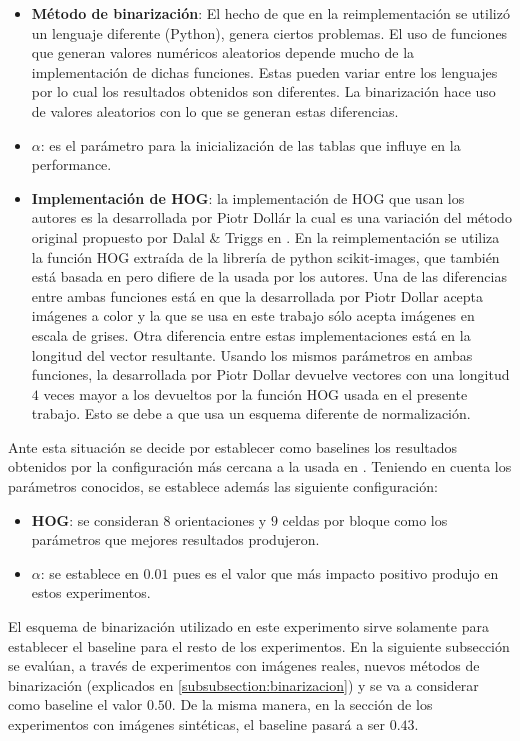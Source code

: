 	\begin{itemize}
		\item \textbf{Método de binarización}: El hecho de que en la reimplementación se utilizó un lenguaje diferente (Python), genera ciertos problemas. El uso de funciones que generan valores numéricos aleatorios depende mucho de la implementación de dichas funciones. Estas pueden variar entre los lenguajes por lo cual los resultados obtenidos son diferentes. La binarización hace uso de valores aleatorios con lo que se generan estas diferencias.
		\item \textbf{$\alpha$}: es el parámetro para la inicialización de las tablas que influye en la performance.
		\item \textbf{Implementación de HOG}: la implementación de HOG que usan los autores es la desarrollada por Piotr Dollár \cite{PiotrD} la cual es una variación del método original propuesto por Dalal \& Triggs en \cite{DT05}. En la reimplementación se utiliza la función HOG extraída de la librería de python scikit-images, que también está basada en \cite{DT05} pero difiere de la usada por los autores. Una de las diferencias entre ambas funciones está en que la desarrollada por Piotr Dollar acepta imágenes a color y la que se usa en este trabajo sólo acepta imágenes en escala de grises. Otra diferencia entre estas implementaciones está en la longitud del vector resultante. Usando los mismos parámetros en ambas funciones, la desarrollada por Piotr Dollar devuelve vectores con una longitud $4$ veces mayor a los devueltos por la función HOG usada en el presente trabajo. Esto se debe a que usa un esquema diferente de normalización.
	\end{itemize}
	
	Ante esta situación se decide por establecer como baselines los resultados obtenidos por la configuración más cercana a la usada en \cite{wang}. Teniendo en cuenta los parámetros conocidos, se establece además las siguiente configuración:
	
	\begin{itemize}
		\item \textbf{HOG}: se consideran $8$ orientaciones y $9$ celdas por bloque como los parámetros que mejores resultados produjeron.
		\item \textbf{$\alpha$}: se establece en $0.01$ pues es el valor que más impacto positivo produjo en estos experimentos.
	\end{itemize}		
	
	El esquema de binarización utilizado en este experimento sirve solamente para establecer el baseline para el resto de los experimentos. En la siguiente subsección se evalúan, a través de experimentos con imágenes reales, nuevos métodos de binarización (explicados en \ref{subsubsection:binarizacion}) y se va a considerar como baseline el valor $0.50$. De la misma manera, en la sección de los experimentos con imágenes sintéticas, el baseline pasará a ser $0.43$.
	
